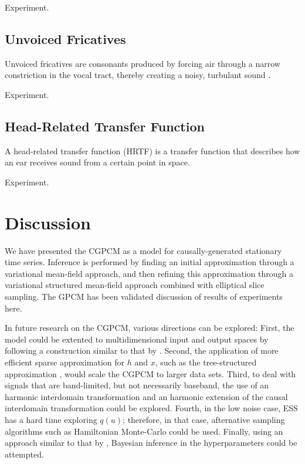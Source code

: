 \documentclass{article}
\begin{document}
{\color{red} Experiment.}

\subsection{Unvoiced Fricatives}
Unvoiced fricatives are consonants produced by forcing air through a narrow constriction in the vocal tract, thereby creating a noisy, turbulant sound \cite{Taylor:2009:Text-To-Speech_Synthesis}.

{\color{red} Experiment.}

\subsection{Head-Related Transfer Function}
A head-related transfer function (HRTF) is a transfer function that describes how an ear receives sound from a certain point in space.

{\color{red} Experiment.}

\section{Discussion}
We have presented the CGPCM as a model for causally-generated stationary time series. Inference is performed by finding an initial approximation through a variational mean-field approach, and then refining this approximation through a variational structured mean-field approach combined with elliptical slice sampling. The GPCM has been validated {\color{red} discussion of results of experiments here.}

In future research on the CGPCM, various directions can be explored: First, the model could be extented to multidimensional input and output spaces by following a construction similar to that by \citet{Bruinsma:2016:GGPCM}. Second, the application of more efficient sparse approximation for $h$ and $x$, such as the tree-structured approximation \cite{Bui:2014:Tree-Structured_Gaussian}, would scale the CGPCM to larger data sets. Third, to deal with signals that are band-limited, but not necessarily baseband, the use of an harmonic interdomain transformation \cite{Tobar:2015:Inter-Domain_Inducing} and an harmonic extension of the causal interdomain transformation could be explored. Fourth, in the low noise case, ESS has a hard time exploring $q(u)$; therefore, in that case, afternative sampling algorithms such as Hamiltonian Monte-Carlo \cite{Neal:2012:MCMC_Using_Hamiltonian_Dynamics} could be used. Finally, using an approach similar to that by \citet{Lazaro-Gredilla:2013:Variational_Inference_for_Mahalanobis_Distance}, Bayesian inference in the hyperparameters could be attempted.
\end{document}
